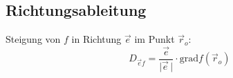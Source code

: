 \subsection{Richtungsableitung}
    Steigung von $f$ in Richtung $\vec{e}$ im Punkt $\vec{r}_o$:
    $$
        D_{\vec{e}f} = \frac{\vec{e}}{ \lvert\vec{e}\,\rvert} \cdot \textrm{grad} f (\vec{r}_o)
    $$